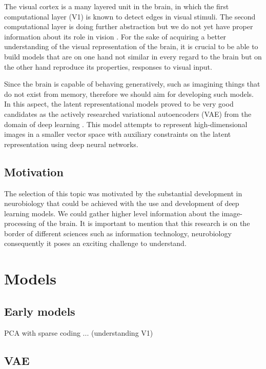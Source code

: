\documentclass[11pt, english]{article}
\begin{document}
\par  The visual cortex is a many layered unit in the brain, in which the first computational layer (V1) is known to detect edges in visual stimuli.
The second computational layer is doing further abstraction but we do not yet
have proper information about its role in vision \cite{ZiembaV2}. For the sake of acquiring a
better understanding of the visual representation of the brain, it is crucial to be able to build models that are on one hand not similar in every regard to the brain but on the other hand reproduce its properties, responses to visual input.
\par Since the brain is capable of behaving generatively, such as imagining things that do not exist from memory, therefore we should aim for developing such models. In this aspect, the latent representational models proved to be very good candidates as the actively researched variational autoencoders (VAE) from the domain of deep learning \cite{kingma2013auto}. This model attempts to represent high-dimensional images in a smaller vector space with auxiliary constraints on the latent representation using deep neural networks.

\subsection{Motivation}

\par The selection of this topic was motivated by the substantial development in neurobiology that could be achieved with the use and development of deep learning models. We could gather higher level information about the image-processing of the brain. It is important to mention that this research is on the border of different sciences such as information technology, neurobiology consequently it poses an exciting challenge to understand.

\section{Models}

\subsection{Early models}

\par PCA with sparse coding \cite{olshausen1996emergence} ... (understanding V1)

\subsection{VAE}
\end{document}
